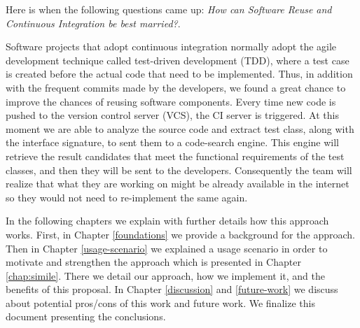 Here is when the following questions came up: \emph{How can Software Reuse and Continuous Integration be best married?}.

Software projects that adopt continuous integration normally adopt the agile development technique called test-driven development (TDD), where a test case is created before the actual code that need to be implemented. Thus, in addition with the frequent commits made by the developers, we found a great chance to improve the chances of reusing software components. Every time new code is pushed to the version control server (VCS), the CI server is triggered. At this moment we are able to analyze the source code and extract test class, along with the interface signature, to sent them to a code-search engine. This engine will retrieve the result candidates that meet the functional requirements of the test classes, and then they will be sent to the developers. Consequently the team will realize that what they are working on might be already available in the internet so they would not need to re-implement the same again.

In the following chapters we explain with further details how this approach works. First, in Chapter \ref{foundations} we provide a background for the approach. Then in Chapter \ref{usage-scenario} we explained a usage scenario in order to motivate and strengthen the approach which is presented in Chapter \ref{chap:simile}. There we detail our approach, how we implement it, and the benefits of this proposal. In Chapter \ref{discussion} and \ref{future-work} we discuss about potential pros/cons of this work and future work. We finalize this document presenting the conclusions.




